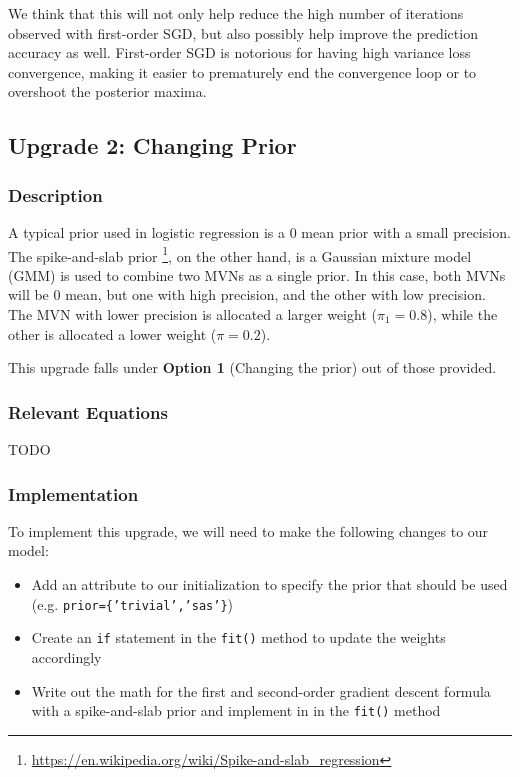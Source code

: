 \documentclass[12pt]{extarticle}
\begin{document}
We think that this will not only help reduce the high number of iterations observed with first-order SGD, but also possibly help improve the prediction accuracy as well. First-order SGD is notorious for having high variance loss convergence, making it easier to prematurely end the convergence loop or to overshoot the posterior maxima.

\newpage

\subsection{Upgrade 2: Changing Prior}

\subsubsection{Description}

A typical prior used in logistic regression is a 0 mean prior with a small precision. The spike-and-slab prior \footnote{\url{https://en.wikipedia.org/wiki/Spike-and-slab_regression}}, on the other hand, is a Gaussian mixture model (GMM) is used to combine two MVNs as a single prior. In this case, both MVNs will be 0 mean, but one with high precision, and the other with low precision. The MVN with lower precision is allocated a larger weight ($\pi_1 = 0.8$), while the other is allocated a lower weight ($\pi = 0.2$).

This upgrade falls under \textbf{Option 1} (Changing the prior) out of those provided.

\subsubsection{Relevant Equations}

TODO

\subsubsection{Implementation}

To implement this upgrade, we will need to make the following changes to our model:

\begin{itemize}
\item Add an attribute to our initialization to specify the prior that should be used (e.g. \texttt{prior=\{'trivial','sas'\}})
\item Create an \texttt{if} statement in the \texttt{fit()} method to update the weights accordingly
\item Write out the math for the first and second-order gradient descent formula with a spike-and-slab prior and implement in in the \texttt{fit()} method
\end{itemize}
\end{document}
